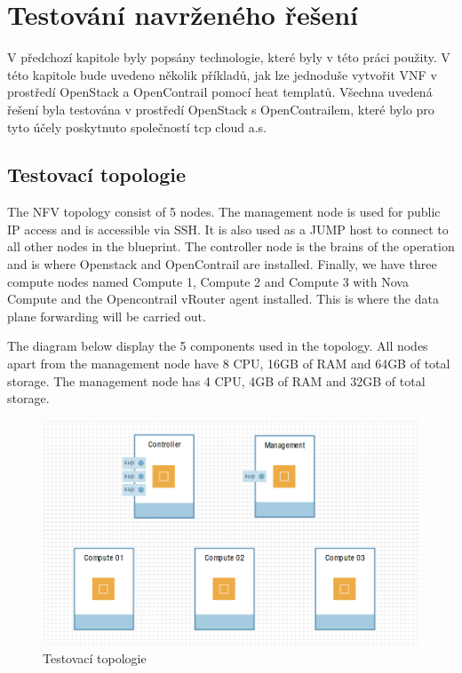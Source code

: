 \chapter{Testování navrženého řešení}

V předchozí kapitole byly popsány technologie, které byly v této práci použity. V této kapitole bude uvedeno několik příkladů, jak lze jednoduše vytvořit VNF v prostředí OpenStack a OpenContrail pomocí heat templatů. Všechna uvedená řešení byla testována v prostředí OpenStack s OpenContrailem, které bylo pro tyto účely poskytnuto společností tcp cloud a.s.

\section{Testovací topologie}\label{sub:interaction}

The NFV topology consist of 5 nodes. The management node is used for public IP access and is accessible via SSH. It is also used as a JUMP host to connect to all other nodes in the blueprint. The controller node is the brains of the operation and is where Openstack and OpenContrail are installed. Finally, we have three compute nodes named Compute 1, Compute 2 and Compute 3 with Nova Compute and the Opencontrail vRouter agent installed. This is where the data plane forwarding will be carried out.

The diagram below display the 5 components used in the topology. All nodes apart from the management node have 8 CPU, 16GB of RAM and 64GB of total storage. The management node has 4 CPU, 4GB of RAM and 32GB of total storage.

\begin{figure}[h]
\begin{centering}
\includegraphics[scale=0.41]{images/ravello_topologie}
\par\end{centering}
\caption{Testovací topologie\label{fig:ravello_topologie}}
\end{figure}



